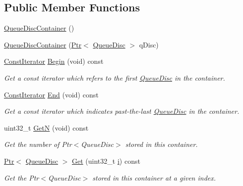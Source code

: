 \subsection*{Public Member Functions}
\begin{DoxyCompactItemize}
\item 
\hyperlink{classns3_1_1QueueDiscContainer_a742cbacacaef876e93d0b097647cfacd}{Queue\+Disc\+Container} ()
\item 
\hyperlink{classns3_1_1QueueDiscContainer_af27e7a7681b95b29074afdf532a8c852}{Queue\+Disc\+Container} (\hyperlink{classns3_1_1Ptr}{Ptr}$<$ \hyperlink{classns3_1_1QueueDisc}{Queue\+Disc} $>$ q\+Disc)
\item 
\hyperlink{classns3_1_1QueueDiscContainer_a3c46b3a107b7b15d6b638ae50b5d9b58}{Const\+Iterator} \hyperlink{classns3_1_1QueueDiscContainer_a67517618d43724e04a2cd3c710934014}{Begin} (void) const 
\begin{DoxyCompactList}\small\item\em Get a const iterator which refers to the first \hyperlink{classns3_1_1QueueDisc}{Queue\+Disc} in the container. \end{DoxyCompactList}\item 
\hyperlink{classns3_1_1QueueDiscContainer_a3c46b3a107b7b15d6b638ae50b5d9b58}{Const\+Iterator} \hyperlink{classns3_1_1QueueDiscContainer_a8b4c3b14d4890bb5fb0e4597e6bf1135}{End} (void) const 
\begin{DoxyCompactList}\small\item\em Get a const iterator which indicates past-\/the-\/last \hyperlink{classns3_1_1QueueDisc}{Queue\+Disc} in the container. \end{DoxyCompactList}\item 
uint32\+\_\+t \hyperlink{classns3_1_1QueueDiscContainer_aeacbea464213a3dce96b5551e30a2f3d}{GetN} (void) const 
\begin{DoxyCompactList}\small\item\em Get the number of Ptr$<$\+Queue\+Disc$>$ stored in this container. \end{DoxyCompactList}\item 
\hyperlink{classns3_1_1Ptr}{Ptr}$<$ \hyperlink{classns3_1_1QueueDisc}{Queue\+Disc} $>$ \hyperlink{classns3_1_1QueueDiscContainer_a236064f6321b5f0d32561bb2a14e74af}{Get} (uint32\+\_\+t \hyperlink{lte__uplink__power__control_8m_a6f6ccfcf58b31cb6412107d9d5281426}{i}) const 
\begin{DoxyCompactList}\small\item\em Get the Ptr$<$\+Queue\+Disc$>$ stored in this container at a given index. \end{DoxyCompactList}\item 

\end{DoxyCompactItemize}
